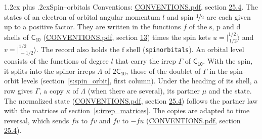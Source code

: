 \documentclass[10pt,a4paper]{article}
\makeatletter
\renewcommand\section{\@startsection{section}{1}{\z@}{-3ex plus -1ex minus -.2ex}%
  {1.2ex plus .2ex}{\normalfont\large\sffamily\bfseries\color{parttitle}}}
\numberwithin{equation}{section}
\newcommand{\grp}[1]{\mathsf{#1}}
\newcommand{\orbital}[1]{\mathrm{#1}}
\newcommand{\mult}{\kappa}
\newcommand{\intx}{\mu}
\newcommand{\jm}[2]{\bigl\lvert{}^{#1}_{\,#2}\bigr\rangle}
\makeatother
\begin{document}
\section{Spin--orbitals}\label{s:spin_orbitals}
Conventions: \href{../../CONVENTIONS.pdf}{CONVENTIONS.pdf}, section \href{../../CONVENTIONS.pdf\#conv.25.4}{25.4}.
\leavevmode\label{n:index.orbital.l}The states of an electron of orbital angular momentum $l$ and spin $\nicefrac{1}{2}$ are each given up to a positive factor. \label{n:local.spinor.uv}\label{n:local.function.f}They are written in the functions $f$ of the $\orbital{s}$, $\orbital{p}$ and $\orbital{d}$ shells of \href{../../../rotation/data/pdf/C10.pdf}{$\grp{C_{10}}$} (\href{../../CONVENTIONS.pdf}{CONVENTIONS.pdf}, section \href{../../../rotation/CONVENTIONS.pdf\#conv.13}{13}) times the spin kets $u = \jm{1/2}{1/2}$ and $v = \jm{1/2}{-1/2}$. The record also holds the $\orbital{f}$ shell (\texttt{spinorbitals}). An orbital level consists of the functions of degree $l$ that carry the irrep $\Gamma$ of \href{../../../rotation/data/pdf/C10.pdf}{$\grp{C_{10}}$}. With the spin, it splits into the spinor irreps $\Lambda$ of $\grp{2C_{10}}$, those of the doublet of $\Gamma$ in the spin--orbit levels (section~\ref{s:spin_orbit}, first column). \label{n:head.state}Under the heading of its shell, a row gives $\Gamma$, a copy $\mult$ of $\Lambda$ (when there are several), its partner $\intx$ and the state. The normalized state (\href{../../CONVENTIONS.pdf}{CONVENTIONS.pdf}, section \href{../../CONVENTIONS.pdf\#conv.25.4}{25.4}) follows the partner law with the matrices of section~\ref{s:irrep_matrices}. The copies are adapted to time reversal, which sends $f u$ to $f v$ and $f v$ to $-f u$ (\href{../../CONVENTIONS.pdf}{CONVENTIONS.pdf}, section \href{../../CONVENTIONS.pdf\#conv.25.4}{25.4}).
\end{document}

